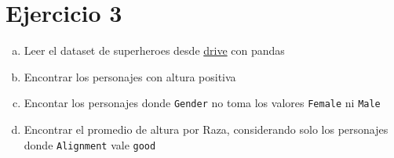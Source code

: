 \documentclass{report}
\begin{document}
\section{Ejercicio 3}
\begin{enumerate}[a)]
	\item Leer el dataset de superheroes desde \href{https://docs.google.com/spreadsheets/d/1nuJAaaH_IP8Q80CsyS940EVaePkbmqhN3vlorDxYMnA/export?format=csv}{drive} con pandas
	\item Encontrar los personajes con altura positiva
	\item Encontar los personajes donde \texttt{Gender} no toma los valores \texttt{Female} ni \texttt{Male}
	\item Encontrar el promedio de altura por Raza, considerando solo los personajes donde \texttt{Alignment} vale \texttt{good}
\end{enumerate}
\end{document}
